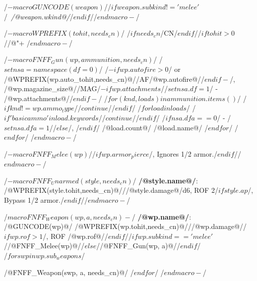 /$-macro GUNCODE(weapon)$//$if weapon.subkind != 'melee'$/~\textit{/@weapon.wkind@/}/$endif$//$endmacro-$/

/$-macro WPREFIX(tohit,needs_cn)$/
/$if needs_cn$/CN/$endif$//$if tohit>0$//@"+%
/$endmacro-$/

/$-macro FNFF_Gun(wp, ammunition, needs_cn)$/
/$set nsa=namespace(df=0)$/
/$-if wp.autofire > 0$/ or /@WPREFIX(wp.auto_tohit,needs_cn)@//AF/@wp.autofire@//$endif-$/, /@wp.magazine_size@//MAG/$-if wp.attachments$//$set nsa.df=1$/ - /@wp.attachments@//$endif-$/
/$ for (knd, loads) in ammunition.items()$/
/$if knd != wp.ammo_type$//$continue$//$endif$/
/$ for load in loads $/
/$if 'basic ammo' in load.keywords$//$continue$//$endif$/
/$if nsa.dfa==0$/ - /$set nsa.dfa=1$//$else$/, /$endif$/
/@load.count@/ /@load.name@/
/$ endfor $/
/$ endfor $/
/$endmacro-$/

/$-macro FNFF_Melee(wp)$//$if wp.armor_pierce$/, Ignores 1/2 armor./$endif$//$endmacro-$/

/$- macro FNFF_Unarmed(style, needs_cn) $/
\noindent\textbf{/@style.name@/}: /@WPREFIX(style.tohit,needs_cn)@///@style.damage@/d6, ROF 2/$if style.ap$/, Bypass 1/2 armor./$endif$//$endmacro-$/

/$ macro FNFF_Weapon(wp, a, needs_cn) -$/
\noindent\textbf{/@wp.name@/}: /@GUNCODE(wp)@/ /@WPREFIX(wp.tohit,needs_cn)@///@wp.damage@//$if wp.rof > 1$/, ROF /@wp.rof@//$endif$//$if wp.subkind == 'melee'$//@FNFF_Melee(wp)@//$else$//@FNFF_Gun(wp, a)@//$endif$/\\
/$for swp in wp.sub_weapons$/

/@FNFF_Weapon(swp, a, needs_cn)@/
/$endfor$/
/$endmacro-$/